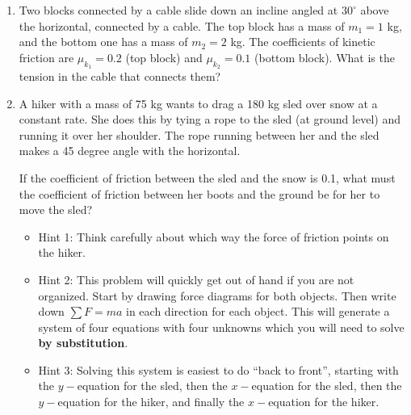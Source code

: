 \documentclass[12pt]{article}
\begin{document}
\begin{enumerate}
\bigskip

\item{Two blocks connected by a cable slide down an incline angled at $30^\circ$ above the horizontal, connected by a cable. The top block has a mass of $m_1=1$ kg, and the bottom one has a mass of $m_2=2$ kg. The coefficients of kinetic friction are 
  $\mu_{k_1}=0.2$ (top block) and $\mu_{k_2}=0.1$ (bottom block). What is the tension in the cable that connects them?}


\bigskip

\item{A hiker with a mass of 75 kg wants to drag a 180 kg sled over snow at a constant rate. She does this by tying a rope to the sled (at ground level) and running it over her shoulder. The rope running between her and the sled makes a 45 degree angle with the horizontal.

  If the coefficient of friction between the sled and the snow is 0.1, what must the coefficient of friction between her boots and the ground be for her to move the sled?}

\begin{itemize}
\item {\sc Hint 1:} Think carefully about which way the force of friction points on the hiker. 
\item {\sc Hint 2:} This problem will quickly get out of hand if you are not organized. Start by drawing force diagrams for both objects. Then write down $\sum F = ma$ in each direction for each object. This will generate a system of four equations with four unknowns which you will need to solve {\bf by substitution}.
\item {\sc Hint 3:} Solving this system is easiest to do ``back to front'', starting with the $y-$equation for the sled, then the $x-$equation for the sled, then the $y-$equation for the hiker, and finally the $x-$equation for the hiker.
\end{itemize}


%


\end{enumerate}
\end{document}
